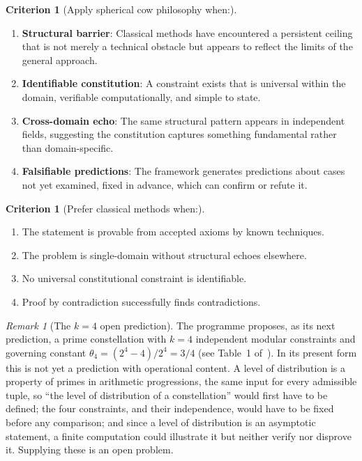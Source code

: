 \documentclass[12pt]{amsart}
\theoremstyle{plain}
\theoremstyle{definition}
\newtheorem{criterion}[theorem]{Criterion}
\theoremstyle{remark}
\newtheorem{remark}[theorem]{Remark}
\begin{document}
\begin{criterion}[Apply spherical cow philosophy when:]
\label{crit:apply}
\begin{enumerate}[label=(\arabic*)]
  \item \textbf{Structural barrier}: Classical methods have encountered a
    persistent ceiling that is not merely a technical obstacle but appears to
    reflect the limits of the general approach.
  \item \textbf{Identifiable constitution}: A constraint exists that is
    universal within the domain, verifiable computationally, and simple to
    state.
  \item \textbf{Cross-domain echo}: The same structural pattern appears in
    independent fields, suggesting the constitution captures something
    fundamental rather than domain-specific.
  \item \textbf{Falsifiable predictions}: The framework generates predictions
    about cases not yet examined, fixed in advance, which can confirm or
    refute it.
\end{enumerate}
\end{criterion}

\begin{criterion}[Prefer classical methods when:]
\label{crit:classical}
\begin{enumerate}[label=(\arabic*)]
  \item The statement is provable from accepted axioms by known techniques.
  \item The problem is single-domain without structural echoes elsewhere.
  \item No universal constitutional constraint is identifiable.
  \item Proof by contradiction successfully finds contradictions.
\end{enumerate}
\end{criterion}

\begin{remark}[The $k=4$ open prediction]
\label{rem:k4}
The programme proposes, as its next prediction, a prime constellation with
$k = 4$ independent modular constraints and governing constant
$\theta_4 = (2^4 - 4)/2^4 = 3/4$ (see Table~1 of~\cite{WakilCF}). In its
present form this is not yet a prediction with operational content. A level of
distribution is a property of primes in arithmetic progressions, the same input
for every admissible tuple, so ``the level of distribution of a
constellation'' would first have to be defined; the four constraints, and their
independence, would have to be fixed before any comparison; and since a level
of distribution is an asymptotic statement, a finite computation could
illustrate it but neither verify nor disprove it. Supplying these is an open
problem.
\end{remark}
\end{document}
